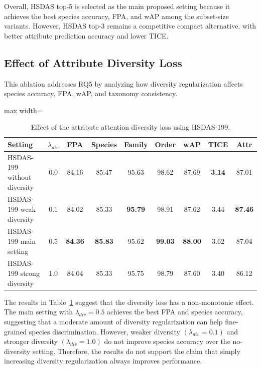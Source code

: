 Overall, HSDAS top-5 is selected as the main proposed setting because it achieves the best species accuracy, FPA, and wAP among the subset-size variants. However, HSDAS top-3 remains a competitive compact alternative, with better attribute prediction accuracy and lower TICE.










\subsection{Effect of Attribute Diversity Loss}

This ablation addresses RQ5 by analyzing how diversity regularization affects species accuracy, FPA, wAP, and taxonomy consistency.

\begin{table}[t]
    \centering
    \caption{Effect of the attribute attention diversity loss using HSDAS-199.}
    \label{tab:diversity_loss_ablation}
    \scriptsize
    \setlength{\tabcolsep}{3pt}
    \renewcommand{\arraystretch}{1.12}
    \begin{adjustbox}{max width=\textwidth}
    \begin{tabular}{@{}lcccccccc@{}}
        \hline
        \textbf{Setting} & \(\lambda_{div}\) & \textbf{FPA} & \textbf{Species} & \textbf{Family} & \textbf{Order} & \textbf{wAP} & \textbf{TICE} & \textbf{Attr} \\
        \hline
        HSDAS-199 without diversity 
        & 0.0 & 84.16 & 85.47 & 95.63 & 98.62 & 87.69 & \textbf{3.14} & 87.01 \\
        HSDAS-199 weak diversity 
        & 0.1 & 84.02 & 85.33 & \textbf{95.79} & 98.91 & 87.62 & 3.44 & \textbf{87.46} \\
        HSDAS-199 main setting 
        & 0.5 & \textbf{84.36} & \textbf{85.83} & 95.62 & \textbf{99.03} & \textbf{88.00} & 3.62 & 87.04 \\
        HSDAS-199 strong diversity 
        & 1.0 & 84.04 & 85.33 & 95.75 & 98.79 & 87.60 & 3.40 & 86.12 \\
        \hline
    \end{tabular}
    \end{adjustbox}
\end{table}

The results in Table~\ref{tab:diversity_loss_ablation} suggest that the diversity loss has a non-monotonic effect. The main setting with \(\lambda_{div}=0.5\) achieves the best FPA and species accuracy, suggesting that a moderate amount of diversity regularization can help fine-grained species discrimination. However, weaker diversity \((\lambda_{div}=0.1)\) and stronger diversity \((\lambda_{div}=1.0)\) do not improve species accuracy over the no-diversity setting. Therefore, the results do not support the claim that simply increasing diversity regularization always improves performance.

